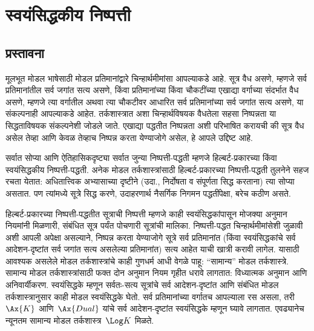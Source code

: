 \chapter{स्वयंसिद्धकीय निष्पत्ती}\label{nml:prf:chap}










\section{प्रस्तावना}\label{nml:axs:int:sec}

मूलभूत मोडल भाषेसाठी मोडल प्रतिमानांद्वारे चिन्हार्थमीमांसा
आपल्याकडे आहे. सूत्र वैध असणे, म्हणजे सर्व
प्रतिमानांतील सर्व जगांत सत्य असणे, किंवा प्रतिमानांच्या
किंवा चौकटींच्या एखाद्या वर्गाच्या संदर्भात वैध असणे,
म्हणजे त्या वर्गातील अथवा त्या चौकटीवर आधारित सर्व
प्रतिमानांच्या सर्व जगांत सत्य असणे, या संकल्पनाही
आपल्याकडे आहेत. तर्कशास्त्रात अशा चिन्हार्थविषयक
वैधतेला सहसा निष्पन्नता या सिद्धताविषयक
संकल्पनेशी जोडले जाते. एखाद्या पद्धतीत
निष्पन्नता अशी परिभाषित करायची की
सूत्र वैध असेल तेव्हा आणि केवळ तेव्हाच
निष्पन्न करता येण्याजोगे असेल, हे आपले उद्दिष्ट आहे.

सर्वात सोप्या आणि ऐतिहासिकदृष्ट्या सर्वात जुन्या
निष्पत्ती-पद्धती म्हणजे हिल्बर्ट-प्रकारच्या किंवा
स्वयंसिद्धकीय निष्पत्ती-पद्धती. अनेक मोडल
तर्कशास्त्रांसाठी हिल्बर्ट-प्रकारच्या निष्पत्ती-पद्धती तुलनेने सहज रचता येतात: अधितात्त्विक अभ्यासाच्या
दृष्टीने (उदा., निर्दोषता व संपूर्णता सिद्ध करताना)
त्या सोप्या असतात. पण त्यांमध्ये सूत्रे सिद्ध
करणे, उदाहरणार्थ नैसर्गिक निगमन पद्धतींपेक्षा, बरेच
कठीण असते.

हिल्बर्ट-प्रकारच्या निष्पत्ती-पद्धतीत
सूत्राची निष्पत्ती म्हणजे काही स्वयंसिद्धकांपासून
मोजक्या अनुमान नियमांनी मिळणारी, संबंधित
सूत्र पर्यंत पोचणारी सूत्रांची मालिका.
निष्पत्ती-पद्धत चिन्हार्थमीमांसेशी जुळावी अशी
आपली अपेक्षा असल्याने, निष्पन्न करता येण्याजोगे सूत्रे
सर्व प्रतिमानांत (किंवा स्वयंसिद्धकांचे सर्व आदेशन-दृष्टांत
सर्व जगांत सत्य असलेल्या प्रतिमानांत) सत्य आहेत याची खात्री करावी लागेल.
यासाठी आवश्यक असलेले मोडल तर्कशास्त्रांचे काही
गुणधर्म आधी वेगळे पाहू: ``सामान्य'' मोडल तर्कशास्त्रे.
सामान्य मोडल तर्कशास्त्रांसाठी फक्त दोन अनुमान नियम
गृहीत धरावे लागतात: विध्यात्मक अनुमान आणि
अनिवार्यीकरण. स्वयंसिद्धके म्हणून सर्वतः-सत्य
सूत्रांचे सर्व आदेशन-दृष्टांत आणि संबंधित मोडल
तर्कशास्त्रानुसार काही मोडल स्वयंसिद्धके घेतो.
सर्व प्रतिमानांच्या वर्गातच आपल्याला रस असला,
तरी~$\Ax{K}$ आणि~$\Ax{Dual}$
यांचे सर्व आदेशन-दृष्टांत स्वयंसिद्धके म्हणून घ्यावे
लागतात. एवढ्यानेच न्यूनतम सामान्य मोडल
तर्कशास्त्र~$\Log K$ मिळते.

